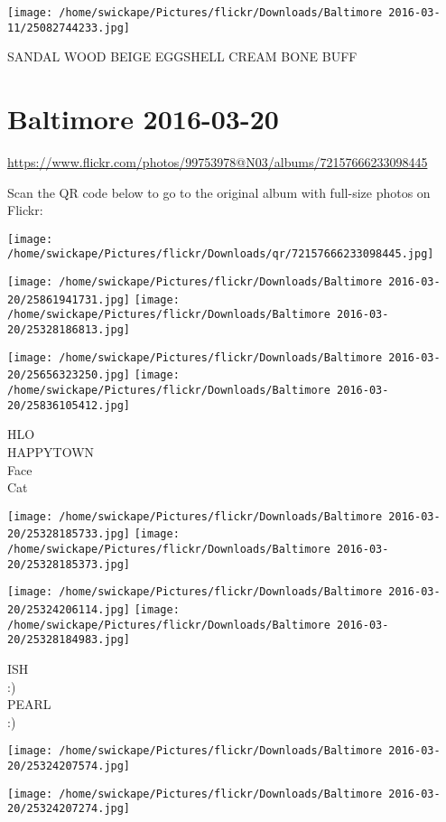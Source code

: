 \documentclass[10pt,letterpaper]{article}
\begin{document}
\texttt{[image: /home/swickape/Pictures/flickr/Downloads/Baltimore 2016-03-11/25082744233.jpg]}

SANDAL WOOD BEIGE EGGSHELL CREAM BONE BUFF
\pagebreak

\section*{Baltimore 2016-03-20}

\url{https://www.flickr.com/photos/99753978@N03/albums/72157666233098445}

Scan the QR code below to go to the original album with full-size photos on Flickr:

\texttt{[image: /home/swickape/Pictures/flickr/Downloads/qr/72157666233098445.jpg]}
\pagebreak

\texttt{[image: /home/swickape/Pictures/flickr/Downloads/Baltimore 2016-03-20/25861941731.jpg]}
\texttt{[image: /home/swickape/Pictures/flickr/Downloads/Baltimore 2016-03-20/25328186813.jpg]}

\texttt{[image: /home/swickape/Pictures/flickr/Downloads/Baltimore 2016-03-20/25656323250.jpg]}
\texttt{[image: /home/swickape/Pictures/flickr/Downloads/Baltimore 2016-03-20/25836105412.jpg]}

HLO\\
HAPPYTOWN\\
Face\\
Cat
\pagebreak

\texttt{[image: /home/swickape/Pictures/flickr/Downloads/Baltimore 2016-03-20/25328185733.jpg]}
\texttt{[image: /home/swickape/Pictures/flickr/Downloads/Baltimore 2016-03-20/25328185373.jpg]}

\texttt{[image: /home/swickape/Pictures/flickr/Downloads/Baltimore 2016-03-20/25324206114.jpg]}
\texttt{[image: /home/swickape/Pictures/flickr/Downloads/Baltimore 2016-03-20/25328184983.jpg]}

ISH\\
:)\\
PEARL\\
:)
\pagebreak

\texttt{[image: /home/swickape/Pictures/flickr/Downloads/Baltimore 2016-03-20/25324207574.jpg]}

\vspace{0.25in}
\texttt{[image: /home/swickape/Pictures/flickr/Downloads/Baltimore 2016-03-20/25324207274.jpg]}
\end{document}
